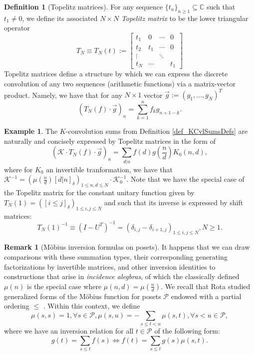 \documentclass[12pt,reqno,a4letter]{article}
\numberwithin{figure}{section}
\numberwithin{table}{section}
\numberwithin{equation}{section}
\newcommand{\Iverson}[1]{\ensuremath{\left[#1\right]_{\delta}}}
\theoremstyle{plain}
\numberwithin{theorem}{section}
\theoremstyle{definition}
\newtheorem{example}[theorem]{Example}
\newtheorem{remark}[theorem]{Remark}
\newtheorem{definition}[theorem]{Definition}
\begin{document}
\begin{definition}[Topelitz matrices]
For any sequence $\{t_n\}_{n \geq 1} \subseteq \mathbb{C}$ such that $t_1 \neq 0$, we define its 
associated $N \times N$ \emph{Topelitz matrix} to be the lower triangular operator 
\[
T_N \equiv T_N(t) := \begin{bmatrix} t_1 & 0 & \cdots & 0 \\ t_2 & t_1 & \cdots & 0 \\ 
          \vdots & & \ddots \\ 
          t_N & \cdots & & t_1
     \end{bmatrix} 
\]
Topelitz matrices define a structure by which we can express the discrete convolution of any 
two sequences (arithmetic functions) via a matrix-vector product. 
Namely, we have that for any $N \times 1$ vector $\vec{g} := (g_1, \ldots, g_N)^{T}$ 
\[
\left(T_N(f) \cdot \vec{g}\right)_{n} = \sum_{k=1}^{n} f_k g_{n+1-k}. 
\]
\end{definition} 

\begin{example} 
\label{example_KCvlSumsExpressedByTopelitzProductConstructions} 
The $K$-convolution sums from 
Definition \ref{def_KCvlSumsDefs} 
are naturally and concisely expressed by Topelitz matrices in the form of 
\[
\left(\mathcal{K} \cdot T_N(f) \cdot \vec{g}\right)_n = 
     \sum_{d|n} f(d) g\left(\frac{n}{d}\right) K_0(n, d), 
\]
where for $K_0$ an invertible tranformation, we have that 
$\mathcal{K}^{-1} = \left(\mu\left(\frac{n}{d}\right) \Iverson{d|n}\right)_{1 \leq n,d \leq N} \cdot \mathcal{K}_0^{-1}$. 
Note that we have the special case of the Topelitz matrix for the constant unitary function 
given by $T_N(1) = (\Iverson{i \leq j})_{1 \leq i,j \leq N}$ and such that its 
inverse is expressed by shift matrices: 
\[
T_N(1)^{-1} \equiv \left(I-U^T\right)^{-1} = 
     (\delta_{i,j} - \delta_{i+1,j})_{1 \leq i,j \leq N}, N \geq 1. 
\]
\end{example}

\begin{remark}[M\"obius inversion formulas on posets]
It happens that we can draw comparisons with these summation types, their 
corresponding generating factorizations by invertible matrices, and other inversion identities to 
constructions that arise in \emph{incidence alegbras}, of which the classically defined 
$\mu(n)$ is the special case where $\mu(n,d) = \mu\left(\frac{n}{d}\right)$. 
We recall that Rota studied 
generalized forms of the M\"obius function for posets $\mathcal{P}$ endowed with a 
partial ordering $\leq$ \cite{ROTA}. Within this context, we define 
\[
\mu(s,s) = 1, \forall s \in \mathcal{P}, \mu(s,u) = -\sum_{s \leq t < u} \mu(s,t), \forall s<u \in \mathcal{P}, 
\]
where we have an inversion relation for all $t \in \mathcal{P}$ of the following form:
\[
g(t) = \sum_{s \leq t} f(s) \iff f(t) = \sum_{s \leq t} g(s) \mu(s,t). 
\]
\end{remark}
\end{document}
